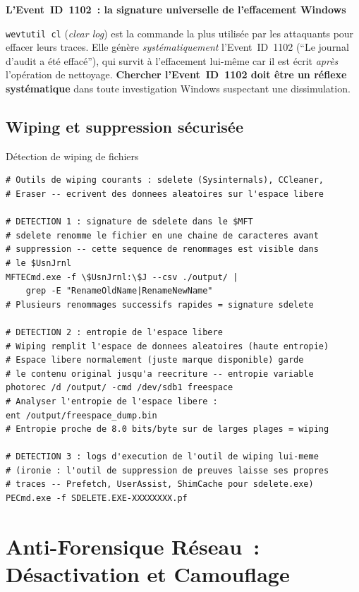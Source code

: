 \begin{boxalert}
\textbf{L'Event~ID~1102~: la signature universelle de l'effacement Windows}

\texttt{wevtutil cl} (\textit{clear log}) est la commande la plus
utilisée par les attaquants pour effacer leurs traces. Elle génère
\emph{systématiquement} l'Event~ID~1102 (``Le journal d'audit a été
effacé''), qui survit à l'effacement lui-même car il est écrit
\emph{après} l'opération de nettoyage. \textbf{Chercher l'Event~ID~1102
doit être un réflexe systématique} dans toute investigation Windows
suspectant une dissimulation.
\end{boxalert}

\subsection{Wiping et suppression sécurisée}

\begin{boxoutils}{Détection de wiping de fichiers}
\begin{lstlisting}[language=bash_forensique]
# Outils de wiping courants : sdelete (Sysinternals), CCleaner,
# Eraser -- ecrivent des donnees aleatoires sur l'espace libere

# DETECTION 1 : signature de sdelete dans le $MFT
# sdelete renomme le fichier en une chaine de caracteres avant
# suppression -- cette sequence de renommages est visible dans
# le $UsnJrnl
MFTECmd.exe -f \$UsnJrnl:\$J --csv ./output/ |
    grep -E "RenameOldName|RenameNewName"
# Plusieurs renommages successifs rapides = signature sdelete

# DETECTION 2 : entropie de l'espace libere
# Wiping remplit l'espace de donnees aleatoires (haute entropie)
# Espace libere normalement (juste marque disponible) garde
# le contenu original jusqu'a reecriture -- entropie variable
photorec /d /output/ -cmd /dev/sdb1 freespace
# Analyser l'entropie de l'espace libere :
ent /output/freespace_dump.bin
# Entropie proche de 8.0 bits/byte sur de larges plages = wiping

# DETECTION 3 : logs d'execution de l'outil de wiping lui-meme
# (ironie : l'outil de suppression de preuves laisse ses propres
# traces -- Prefetch, UserAssist, ShimCache pour sdelete.exe)
PECmd.exe -f SDELETE.EXE-XXXXXXXX.pf
\end{lstlisting}
\end{boxoutils}

\section{Anti-Forensique Réseau~: Désactivation et Camouflage}
\label{sec:anti-for-reseau}

